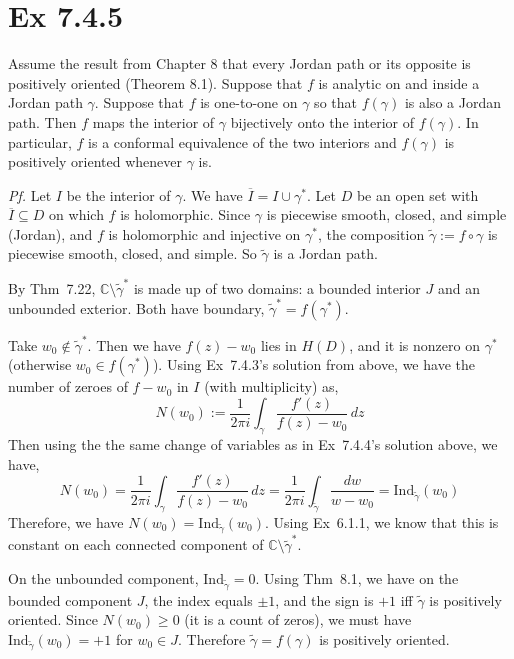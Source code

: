 \documentclass[a4paper]{article}
\begin{document}
\newpage
\section*{Ex 7.4.5}

\begin{tcolorbox}[colback=gray!10, colframe=black, boxrule=0.5pt, arc=2mm]
Assume the result from Chapter 8 that every Jordan path or its opposite is positively oriented
(Theorem 8.1). Suppose that $f$ is analytic on and inside a Jordan path $\gamma$. Suppose that
$f$ is one-to-one on $\gamma$ so that $f(\gamma)$ is also a Jordan path. Then $f$ maps the
interior of $\gamma$ bijectively onto the interior of $f(\gamma)$. In particular, $f$ is a
conformal equivalence of the two interiors and $f(\gamma)$ is positively oriented whenever
$\gamma$ is.
\end{tcolorbox}

\textit{Pf.} Let $I$ be the interior of $\gamma$. We have $\overline{I} = I \cup \gamma^*$. Let $D$ be an open
set with $\overline{I} \subseteq D$ on which $f$ is holomorphic. Since $\gamma$ is piecewise
smooth, closed, and simple (Jordan), and $f$ is holomorphic and injective on $\gamma^*$, the
composition $\tilde{\gamma} := f \circ \gamma$ is piecewise smooth, closed, and simple. So
$\tilde{\gamma}$ is a Jordan path. 


By Thm~7.22, $\mathbb{C} \setminus \tilde{\gamma}^*$ is made up of two domains: a bounded interior $J$ and an unbounded exterior. Both have boundary,
$\tilde{\gamma}^* = f(\gamma^*)$.

\medskip
Take $w_0 \notin \tilde{\gamma}^*$. Then we have $f(z) - w_0$ lies in $H(D)$, and it is nonzero on $\gamma^*$ (otherwise $w_0 \in f(\gamma^*)$). Using Ex~7.4.3's solution from above, we have the number of zeroes of $f-w_0$ in $I$ (with multiplicity) as,
\[
N(w_0) := \frac{1}{2\pi i}\int_\gamma \frac{f'(z)}{f(z) - w_0}\,dz
\]
Then using the the same change of variables as in Ex~7.4.4's solution above, we have,
\[
N(w_0) = \frac{1}{2\pi i}\int_\gamma \frac{f'(z)}{f(z) - w_0}\,dz
= \frac{1}{2\pi i}\int_{\tilde{\gamma}} \frac{dw}{w - w_0}
= \mathrm{Ind}_{\tilde{\gamma}}(w_0)
\]
Therefore, we have $N(w_0) = \mathrm{Ind}_{\tilde{\gamma}}(w_0)$. Using Ex~6.1.1, we know that this is constant on each connected
component of $\mathbb{C} \setminus \tilde{\gamma}^*$.

\medskip
On the unbounded component,
$\mathrm{Ind}_{\tilde{\gamma}} = 0$. Using Thm~8.1, we have on the bounded component $J$, the index
equals $\pm 1$, and the sign is $+1$ iff $\tilde{\gamma}$ is positively oriented. Since
$N(w_0) \geq 0$ (it is a count of zeros), we must have $\mathrm{Ind}_{\tilde{\gamma}}(w_0) = +1$ for
$w_0 \in J$. Therefore $\tilde{\gamma} = f(\gamma)$ is positively oriented.
\end{document}
